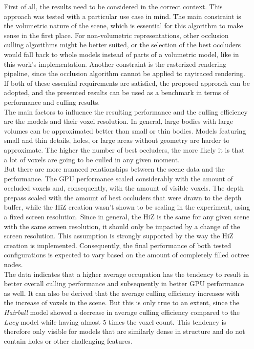\noindent
First of all, the results need to be considered in the correct context. This approach was tested with a particular use case 
in mind. The main constraint is the volumetric nature of the scene, which is essential for this algorithm to make sense in 
the first place. For non-volumetric representations, other occlusion culling algorithms might be better suited, or the 
selection of the best occluders would fall back to whole models instead of parts of a volumetric model, like in this work's 
implementation. Another constraint is the rasterized rendering pipeline, since the occlusion algorithm cannot be applied to 
raytraced rendering. If both of these essential requirements are satisfied, the proposed approach can be adopted, and the 
presented results can be used as a benchmark in terms of performance and culling results. \\

\noindent
The main factors to influence the resulting performance and the culling efficiency are the models and their voxel resolution.
In general, large bodies with large volumes can be approximated better than small or thin bodies. Models featuring small and 
thin details, holes, or large areas without geometry are harder to approximate. The higher the number of best occluders, the 
more likely it is that a lot of voxels are going to be culled in any given moment. \\

\noindent
But there are more nuanced relationships between the scene data and the performance. The \ac{GPU} performance scaled considerably 
with the amount of occluded voxels and, consequently, with the amount of visible voxels. The depth prepass scaled with the amount 
of best occluders that were drawn to the depth buffer, while the \ac{HiZ} creation wasn't shown to be scaling in the experiment, 
using a fixed screen resolution. Since in general, the \ac{HiZ} is the same for any given scene with the same screen resolution, 
it should only be impacted by a change of the screen resolution. This assumption is strongly supported by the way the \ac{HiZ} 
creation is implemented. Consequently, the final performance of both tested configurations is expected to vary based on the amount 
of completely filled octree nodes. \\

\noindent
The data indicates that a higher average occupation has the tendency to result in better overall culling performance and subsequently 
in better \ac{GPU} performance as well. It can also be derived that the average culling efficiency increases with the increase of 
voxels in the scene. But this is only true to an extent, since the \emph{Hairball} model showed a decrease in average culling efficiency 
compared to the \emph{Lucy} model while having almost 5 times the voxel count. This tendency is therefore only visible for models 
that are similarly dense in structure and do not contain holes or other challenging features.\\

